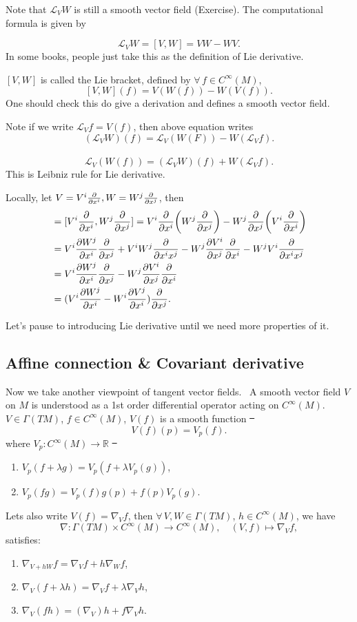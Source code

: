 Note that \(\mathcal{L}_V W\) is still a smooth vector field (Exercise). The
computational formula is given by
\begin{prop} \[
    \mathcal{L}_V W=\left[V,W\right]=VW-WV
.\] In some books, people just take this as the definition of Lie derivative.
\end{prop}

\([V,W]\) is called the Lie bracket, defined by \(\forall\,f\in C^\infty(M)\),
\[
    [V,W](f)=V(W(f))-W(V(f))
.\] One should check this do give a derivation and defines a smooth vector
field.

Note if we write \(\mathcal{L}_V f=V(f)\), then above equation writes \[
    (\mathcal{L}_V W)(f)=\mathcal{L}_V(W(F))-W(\mathcal{L}_V f)
.\] \ie\ \[
    \mathcal{L}_V(W(f))=(\mathcal{L}_V W)(f)+W(\mathcal{L}_V f)
.\] This is Leibniz rule for Lie derivative.

Locally, let \(V=V^i\pdv{x^i},W=W^j\pdv{x^j}\), then
\begin{align*}
    [V,W]&= [V^i\pdv{x^i},W^j\pdv{x^j}]=V^i\pdv{x^i}(W^j\pdv{x^j})
    -W^j\pdv{x^j}(V^i\pdv{x^i}) \\
    &= V^i\pdv{W^j}{x^i}\pdv{x^j}+V^iW^j\pdv{x^ix^j}
    -W^j\pdv{V^i}{x^j}\pdv{x^i}-W^jV^i\pdv{x^ix^j} \\
    &= V^i\pdv{W^j}{x^i}\pdv{x^j}-W^j\pdv{V^i}{x^j}\pdv{x^i} \\
    &= (V^i\pdv{W^j}{x^i}-W^i\pdv{V^j}{x^i})\pdv{x^j}
.\end{align*}

Let's pause to introducing Lie derivative until we need more properties of it.

\subsection{Affine connection \& Covariant derivative}
Now we take another viewpoint of tangent vector fields. \ie\ A smooth vector
field \(V\) on \(M\) is understood as a 1st order differential operator acting
on \(C^\infty(M)\). \ie\ \(V\in \Gamma(TM)\), \(f\in C^\infty(M)\), \(V(f)\) is
a smooth function \st\ \[
    V(f)(p)=V_p(f)
.\] where \(V_p\colon C^\infty(M)\to \mathbb{R}\) \st\ 
\begin{enumerate}[(1)]
    \item \(V_p(f+\lambda g)=V_p(f+\lambda V_p(g))\),
    \item \(V_p(fg)=V_p(f)g(p)+f(p)V_p(g)\).
\end{enumerate}
Lets also write \(V(f)=\nabla_V f\), then \(\forall\,V,W\in \Gamma(TM)\),
\(h\in C^\infty(M)\), we have \[
    \nabla\colon \Gamma(TM)\times C^\infty(M)\to C^\infty(M),
    \quad(V,f)\mapsto \nabla_V f,
\]
satisfies:
\begin{enumerate}[(1)]
    \item \(\nabla_{V+hW}f=\nabla_V f+h\nabla_W f\),
    \item \(\nabla_V(f+\lambda h)=\nabla_V f+\lambda \nabla_V h\),
    \item \(\nabla_V(fh)=(\nabla_V)h+f\nabla_V h\).
\end{enumerate}

